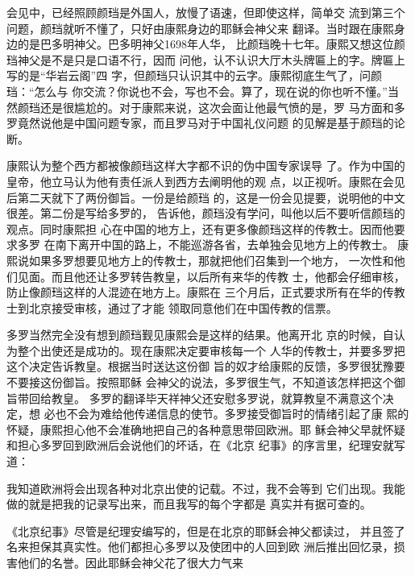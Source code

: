 会见中，已经照顾颜珰是外国人，放慢了语速，但即使这样，简单交%
流到第三个问题，颜珰就听不懂了，只好由康熙身边的耶稣会神父来%
翻译。当时跟在康熙身边的是巴多明神父。巴多明神父1698年人华，%
比颜珰晚十七年。康熙又想这位颜珰神父是不是只是口语不行，因而%
问他，认不认识大厅木头牌匾上的字。牌匾上写的是“华岩云阁”四%
字，但颜珰只认识其中的云字。康熙彻底生气了，问颜珰：“怎么与%
你交流？你说也不会，写也不会。算了，现在说的你也听不懂。”当%
然颜珰还是很尴尬的。对于康熙来说，这次会面让他最气愤的是，罗%
马方面和多罗竟然说他是中国问题专家，而且罗马对于中国礼仪问题%
的见解是基于颜珰的论断。%
\par
康熙认为整个西方都被像颜珰这样大字都不识的伪中国专家误导%
了。作为中国的皇帝，他立马认为他有责任派人到西方去阐明他的观%
点，以正视听。康熙在会见后第二天就下了两份御旨。一份是给颜珰%
的，这是一份会见提要，说明他的中文很差。第二份是写给多罗的，%
告诉他，颜珰没有学问，叫他以后不要听信颜珰的观点。同时康熙担%
心在中国的地方上，还有更多像颜珰这样的传教士。因而他要求多罗%
在南下离开中国的路上，不能巡游各省，去单独会见地方上的传教士。%
康熙说如果多罗想要见地方上的传教士，那就把他们召集到一个地方，%
一次性和他们见面。而且他还让多罗转告教皇，以后所有来华的传教%
士，他都会仔细审核，防止像颜珰这样的人混迹在地方上。康熙在%
三个月后，正式要求所有在华的传教士到北京接受审核，通过了才能%
领取同意他们在中国传教的信票。%
\par
多罗当然完全没有想到颜珰觐见康熙会是这样的结果。他离开北%
京的时候，自认为整个出使还是成功的。现在康熙决定要审核每一个%
人华的传教士，并要多罗把这个决定告诉教皇。根据当时送达这份御%
旨的奴才给康熙的反馈，多罗很犹豫要不要接这份御旨。按照耶稣%
会神父的说法，多罗很生气，不知道该怎样把这个御旨带回给教皇。%
多罗的翻译毕天祥神父还安慰多罗说，就算教皇不满意这个决定，想%
必也不会为难给他传递信息的使节。多罗接受御旨时的情绪引起了康%
熙的怀疑，康熙担心他不会准确地把自己的各种意思带回欧洲。耶%
稣会神父早就怀疑和担心多罗回到欧洲后会说他们的坏话，在《北京%
纪事》的序言里，纪理安就写道：%
\par
{\bookkai 我知道欧洲将会出现各种对北京出使的记载。不过，我不会等到}%
{\bookkai 它们出现。我能做的就是把我的记录写出来，而且我写的每个字都是}%
{\bookkai 真实并有据可查的。}%
\par
《北京纪事》尽管是纪理安编写的，但是在北京的耶稣会神父都读过，%
并且签了名来担保其真实性。他们都担心多罗以及使团中的人回到欧%
洲后推出回忆录，损害他们的名誉。因此耶稣会神父花了很大力气来%
